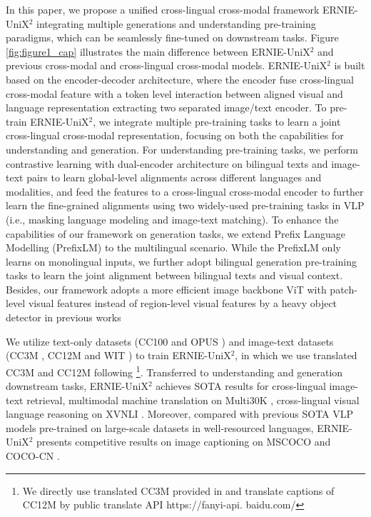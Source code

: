 \documentclass{article}
\begin{document}
In this paper, we propose a unified cross-lingual cross-modal framework ERNIE-UniX$^{2}$ integrating multiple generations and understanding pre-training paradigms,  which can be seamlessly fine-tuned on downstream tasks. Figure \ref{fig:figure1_cap} illustrates the main difference between ERNIE-UniX$^{2}$ and previous cross-modal and cross-lingual cross-modal models.
ERNIE-UniX$^{2}$ is built based on the encoder-decoder architecture, where the encoder fuse cross-lingual cross-modal feature with a token level interaction between aligned visual and language representation extracting two separated image/text encoder.
To pre-train ERNIE-UniX$^{2}$, we integrate multiple pre-training tasks to learn a joint cross-lingual cross-modal representation, focusing on both the capabilities for understanding and generation. 
For understanding pre-training tasks, we perform contrastive learning with dual-encoder architecture on bilingual texts and image-text pairs to learn global-level alignments across different languages and modalities, and feed the features to a cross-lingual cross-modal encoder to further learn the fine-grained alignments using two widely-used pre-training tasks in VLP (i.e., masking language modeling and image-text matching).
To enhance the capabilities of our framework on generation tasks, we extend Prefix Language Modelling (PrefixLM) \cite{simvlm2021} to the multilingual scenario. While the PrefixLM only learns on monolingual inputs, we further adopt bilingual generation pre-training tasks to learn the joint alignment between bilingual texts and visual context. 
Besides, our framework adopts a more efficient image backbone ViT \cite{vit2020} with patch-level visual features instead of region-level visual features by a heavy object detector in previous works \cite{m3p2020,UC22021} 


We utilize text-only datasets (CC100 \cite{xlmr2019} and OPUS \cite{opus-2012}) and image-text datasets (CC3M \cite{coco3m}, CC12M \cite{cc12m} and WIT \cite{wit2021}) to train ERNIE-UniX$^2$, in which we use translated CC3M and CC12M following \cite{UC22021}\footnote{We directly use translated CC3M provided in \cite{UC22021} and translate captions of CC12M by public translate API https://fanyi-api. baidu.com/}. Transferred to understanding and generation downstream tasks, ERNIE-UniX$^{2}$ achieves SOTA results for cross-lingual image-text retrieval, multimodal machine translation on Multi30K \cite{elliott-EtAl:2017:WMT,barrault2018findings}, cross-lingual visual language reasoning on XVNLI \cite{xvnli-lingual}. Moreover, compared with previous SOTA VLP models pre-trained on large-scale datasets in well-resourced languages, ERNIE-UniX$^2$ presents competitive results on image captioning on MSCOCO \cite{mscoco} and COCO-CN \cite{cococn}.
\end{document}
